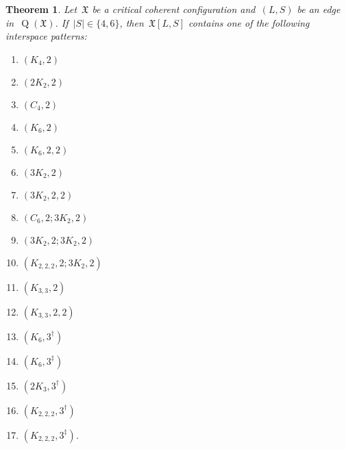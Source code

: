 \documentclass[english,a4paper]{article}
\theoremstyle{plain}
\newtheorem{theorem}             {Theorem}[section]
\theoremstyle{definition}
\newcommand{\abs}[1]{| #1 |}
\newcommand{\coherentConfig}{\ensuremath{\mathfrak{X}}}
\newcommand{\interspace}[2]{\ensuremath{\coherentConfig[#1,#2]}}
\DeclareMathOperator*{\Quotient}{Q}
\newcommand{\quotientGraph}[1]{\ensuremath{\Quotient(#1)}}
\newcommand{\ipfourClique}  {\ensuremath{(\clique{4},2)}}
\newcommand{\ipfourMatching}{\ensuremath{(\disjointCliques{2}{2},2)}}
\newcommand{\ipfourCycle}   {\ensuremath{(\cycle{4},2)}}
\newcommand{\ipsixCliqueTwo}     {\ensuremath{(\clique{6},2)}}
\newcommand{\ipsixCliqueTwoTwice}{\ensuremath{(\clique{6},2,2)}}
\newcommand{\ipsixCliqueThree}   {\ensuremath{(\clique{6},3^\dag)}}
\newcommand{\ipsixCliqueThreeD}	 {\ensuremath{(\clique{6},3^\ddag)}}
\newcommand{\ipsixMatching}             {\ensuremath{(\disjointCliques{3}{2},2)}}
\newcommand{\ipsixMatchingTwice}        {\ensuremath{(\disjointCliques{3}{2},2,2)}}
\newcommand{\ipsixMatchingMatching}     {\ensuremath{(\disjointCliques{3}{2},2;\disjointCliques{3}{2},2)}}
\newcommand{\ipsixMatchingAndCycle}     {\ensuremath{(\cycle{6},2;\disjointCliques{3}{2},2)}}
\newcommand{\ipsixMatchingAndComplement}{\ensuremath{(\clique{2,2,2},2;\disjointCliques{3}{2},2)}}
\newcommand{\ipsixTriangle}               {\ensuremath{(\disjointCliques{2}{3},3^\dag)}}
\newcommand{\ipsixTriangleComplement}     {\ensuremath{(\clique{3,3},2)}}
\newcommand{\ipsixTriangleComplementTwice}{\ensuremath{(\clique{3,3},2,2)}}
\newcommand{\ipsixMatchingComplement} {\ensuremath{(\clique{2,2,2},3^\dag)}}
\newcommand{\ipsixMatchingComplementD}{\ensuremath{(\clique{2,2,2},3^\ddag)}}
\newcommand{\clique}[1]{\ensuremath{K_{#1}}}
\newcommand{\cycle}[1]{\ensuremath{C_{#1}}}
\newcommand{\disjointCliques}[2]{\ensuremath{#1 \clique{#2}}}
\begin{document}
\begin{theorem}
\label{global-argument:large-small-interspace:classification}
    Let~$\coherentConfig$ be a critical coherent configuration and~$(L,S)$ be an edge in~$\quotientGraph{\coherentConfig}$.
    If~$\abs{S} \in \{4,6\}$, then~$\interspace{L}{S}$ contains one of the following interspace patterns:
    \begin{multicols}{4}
        \begin{enumerate}
            \item \ipfourClique
            \item \ipfourMatching
            \item \ipfourCycle
            \item \ipsixCliqueTwo
            \item \ipsixCliqueTwoTwice
            \item \ipsixMatching
            \item \ipsixMatchingTwice
            \item \ipsixMatchingAndCycle
            \item \ipsixMatchingMatching
            \item \ipsixMatchingAndComplement
            \item \ipsixTriangleComplement
            \item \ipsixTriangleComplementTwice
            \item \ipsixCliqueThree
            \item \ipsixCliqueThreeD
            \item \ipsixTriangle
            \item \ipsixMatchingComplement
            \item \ipsixMatchingComplementD.
        \end{enumerate}
    \end{multicols}
\end{theorem}
\end{document}

